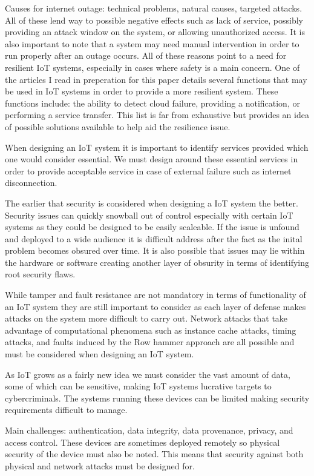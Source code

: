 \documentclass{sig-alternate}
\begin{document}
Causes for internet outage: technical problems, natural causes, targeted attacks. All of these lend way to possible negative effects such as lack of service, possibly providing an attack window on the system, or allowing unauthorized access. It is also important to note that a system may need manual intervention in order to run properly after an outage occurs. All of these reasons point to a need for resilient IoT systems, especially in cases where safety is a main concern. One of the articles I read in preperation for this paper details several functions that may be used in IoT systems in order to provide a more resilient system. These functions include: the ability to detect cloud failure, providing a notification, or performing a service transfer. This list is far from exhaustive but provides an idea of possible solutions available to help aid the resilience issue.

When designing an IoT system it is important to identify services provided which one would consider essential. We must design around these essential services in order to provide acceptable service in case of external failure such as internet disconnection.

The earlier that security is considered when designing a IoT system the better. Security issues can quickly snowball out of control especially with certain IoT systems as they could be designed to be easily scaleable. If the issue is unfound and deployed to a wide audience it is difficult address after the fact as the inital problem becomes obsured over time. It is also possible that issues may lie within the hardware or software creating another layer of obsurity in terms of identifying root security flaws.

While tamper and fault resistance are not mandatory in terms of functionality of an IoT system they are still important to consider as each layer of defense makes attacks on the system more difficult to carry out. Network attacks that take advantage of computational phenomena such as instance cache attacks, timing attacks, and faults induced by the Row hammer approach are all possible and must be considered when designing an IoT system.

As IoT grows as a fairly new idea we must consider the vast amount of data, some of which can be sensitive, making IoT systems lucrative targets to cybercriminals. The systems running these devices can be limited making security requirements difficult to manage.

Main challenges: authentication, data integrity, data provenance, privacy, and access control. These devices are sometimes deployed remotely so physical security of the device must also be noted. This means that security against both physical and network attacks must be designed for.
\end{document}
